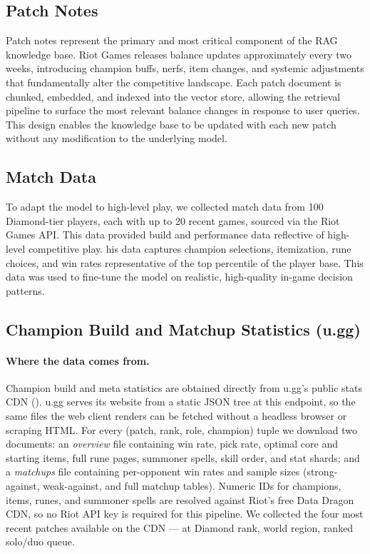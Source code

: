 \documentclass[fleqn,moreauthors,10pt]{ds_report}
\begin{document}
    \subsection*{Patch Notes}

    Patch notes represent the primary and most critical component of the RAG knowledge base. Riot Games releases balance updates approximately every two weeks, introducing champion buffs, nerfs, item changes, and systemic adjustments that fundamentally alter the competitive landscape. Each patch document is chunked, embedded, and indexed into the vector store, allowing the retrieval pipeline to surface the most relevant balance changes in response to user queries. This design enables the knowledge base to be updated with each new patch without any modification to the underlying model.




\subsection*{Match Data}

To adapt the model to high-level play, we collected match data from 100 Diamond-tier players, each with up to 20 recent games, sourced via the Riot Games API. This data provided build and performance data reflective of high-level competitive play. his data captures champion selections, itemization, rune choices, and win rates representative of the top percentile of the player base. This data was used to fine-tune the model on realistic, high-quality in-game decision patterns.


\subsection*{Champion Build and Matchup Statistics (u.gg)}

\paragraph{Where the data comes from.}
Champion build and meta statistics are obtained directly from u.gg's public stats CDN
(). u.gg serves its website from a static JSON tree at this
endpoint, so the same files the web client renders can be fetched without a headless
browser or scraping HTML. For every (patch, rank, role, champion) tuple we download two
documents: an \emph{overview} file containing win rate, pick rate, optimal core and
starting items, full rune pages, summoner spells, skill order, and stat shards; and a
\emph{matchups} file containing per-opponent win rates and sample sizes (strong-against,
weak-against, and full matchup tables). Numeric IDs for champions, items, runes, and
summoner spells are resolved against Riot's free Data Dragon CDN, so no Riot API key is
required for this pipeline. We collected the four most recent patches available on the
CDN — at Diamond rank,
world region, ranked solo/duo queue.
\end{document}
